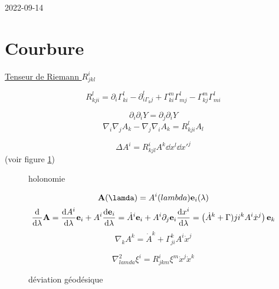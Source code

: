 


2022-09-14

\section*{Courbure}



\underline{Tenseur de Riemann $R_{jkl}^i$ } 

$$R_{kji}^{l}= \partial_i \Gamma_{ki}^{l}-\partial_{i\Gamma_kj}^{l}+ \Gamma_{ki}^{m}\Gamma_{mj}^{l}- \Gamma_{kj}^{m}\Gamma_{mi}^{l}$$ 


\begin{tcolorbox}[title=(1) Non commutativité des dérivées covarientes]

	$$\partial_i \partial_i Y = \partial_j \partial_i Y$$ 
	$$\nabla_i \nabla_j A_k -\nabla_j \nabla_i A_k = R_{kji}^{l}A_l $$ 
	 
\end{tcolorbox}

\begin{tcolorbox}[title= (2) holonomie]
$$\Delta A^{i} = R_{kjl}^{i}A^{k}\dd x^l \dd x'^j$$ 
(voir figure \ref{fig:holonomie})
\end{tcolorbox}

\begin{figure}[ht]
    \centering
    \caption{holonomie}
    \label{fig:holonomie}
\end{figure}


\begin{tcolorbox}[title=(3) déviation géodésique]
\begin{tcolorbox}[title=dérivé intrinsèque]
	$$\vb{A}(\lamda) = A^{i}(lambda) \vb{e}_i(\lambda)$$ 
	$$\dv{{}}{\lambda} \vb{A} = \dv{A^{i}}{\lambda} \vb{e}_i + A^{i} \dv{\vb{e}_i}{\lambda}  = \dot A^{i}\vb{e}_i + A^{i}\partial_j \vb{e}_i \dv{x^{i}}{\lambda}  = \left( \dot A^{k}+ \Gamma)ji^{k} A^{i}\dot x^j \right) \vb{e}_k$$ 
	$$\nabla_k A^{k}= \dot A^{k}+\Gamma_{ji}^{k}A^{i}\dot x^j$$ 
\end{tcolorbox}

$$\boxed{\nabla_{lamda}^{2}\xi^{i}= R_{jkm}^{i}\xi^{m}\dot x^{j}\dot x^{k}}$$ 
	 
\end{tcolorbox}

\begin{figure}[ht]
    \centering
    \caption{déviation géodésique}
    \label{fig:déviation-géodésique}
\end{figure}


